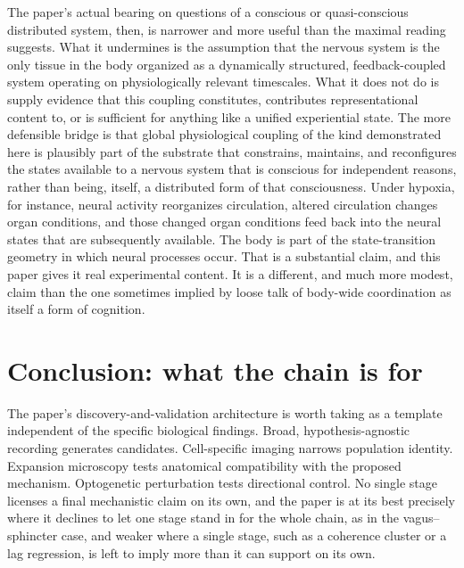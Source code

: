 \documentclass[11pt]{article}
\begin{document}
The paper's actual bearing on questions of a conscious or quasi-conscious distributed system, then, is narrower and more useful than the maximal reading suggests. What it undermines is the assumption that the nervous system is the only tissue in the body organized as a dynamically structured, feedback-coupled system operating on physiologically relevant timescales. What it does not do is supply evidence that this coupling constitutes, contributes representational content to, or is sufficient for anything like a unified experiential state. The more defensible bridge is that global physiological coupling of the kind demonstrated here is plausibly part of the substrate that constrains, maintains, and reconfigures the states available to a nervous system that is conscious for independent reasons, rather than being, itself, a distributed form of that consciousness. Under hypoxia, for instance, neural activity reorganizes circulation, altered circulation changes organ conditions, and those changed organ conditions feed back into the neural states that are subsequently available. The body is part of the state-transition geometry in which neural processes occur. That is a substantial claim, and this paper gives it real experimental content. It is a different, and much more modest, claim than the one sometimes implied by loose talk of body-wide coordination as itself a form of cognition.

\section{Conclusion: what the chain is for}

The paper's discovery-and-validation architecture is worth taking as a template independent of the specific biological findings. Broad, hypothesis-agnostic recording generates candidates. Cell-specific imaging narrows population identity. Expansion microscopy tests anatomical compatibility with the proposed mechanism. Optogenetic perturbation tests directional control. No single stage licenses a final mechanistic claim on its own, and the paper is at its best precisely where it declines to let one stage stand in for the whole chain, as in the vagus--sphincter case, and weaker where a single stage, such as a coherence cluster or a lag regression, is left to imply more than it can support on its own.
\end{document}
